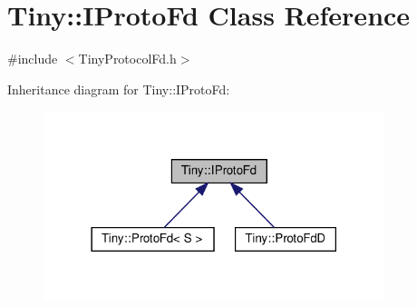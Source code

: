 \hypertarget{classTiny_1_1IProtoFd}{}\section{Tiny\+:\+:I\+Proto\+Fd Class Reference}
\label{classTiny_1_1IProtoFd}


{\ttfamily \#include $<$Tiny\+Protocol\+Fd.\+h$>$}



Inheritance diagram for Tiny\+:\+:I\+Proto\+Fd\+:
\nopagebreak
\begin{figure}[H]
\begin{center}
\leavevmode
\includegraphics[width=282pt]{classTiny_1_1IProtoFd__inherit__graph}
\end{center}
\end{figure}
